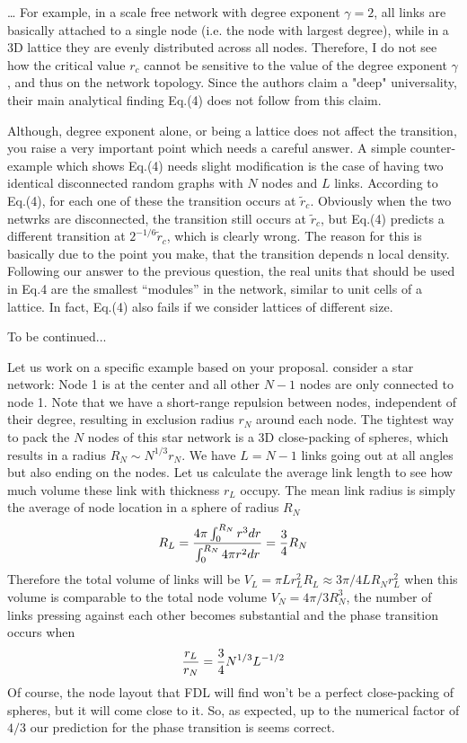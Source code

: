 \documentclass[11pt]{article}
\begin{document}
\begin{response}{
\dots 
For example, in a scale free network with degree exponent $\gamma=2$, all links are basically 
attached to a single node (i.e. the node with largest degree), while in a 3D lattice they are evenly distributed across all nodes. Therefore, I do not see how the critical value $r_c$ cannot be sensitive to the value of the degree exponent $\gamma$, and thus on the network topology. Since the authors claim a "deep" universality, their main analytical finding Eq.(4) does not follow from this claim.

}
Although, degree exponent alone, or being a lattice does not affect the transition, you raise a very important point which needs a careful answer.
A simple counter-example which shows Eq.(4) needs slight modification is the case of having two identical disconnected random graphs with $N$ nodes and $L$ links. 
According to Eq.(4), for each one of these the transition occurs at $\tilde{r}_c$. 
Obviously when the two netwrks are disconnected, the transition still occurs at $\tilde{r}_c$, but Eq.(4) predicts a different transition at $2^{-1/6}\tilde{r}_c$, which is clearly wrong. 
The reason for this is basically due to the point you make, that the transition depends n local density. 
Following our answer to the previous question,  the real units that should be used in Eq.4 are the smallest ``modules'' in the network, similar to unit cells of a lattice.
In fact, Eq.(4) also fails if we consider lattices of different size.

{\color{red} To be continued...}

Let us work on a specific example based on your proposal.
consider a star network: 
Node 1 is at the center and all other $N-1$ nodes are only connected to node 1. 
Note that we have a short-range repulsion between nodes, independent of their degree, resulting in exclusion radius $r_N$ around each node. 
The tightest way to pack the $N$ nodes of this star network is a 3D close-packing of spheres, which results in a radius $R_N\sim N^{1/3}r_N$.
We have $L=N-1$ links going out at all angles but also ending on the nodes.
Let us calculate the average link length to see how much volume these link with thickness $r_L$ occupy. 
The mean link radius is simply the average of node location in a sphere of radius $R_N$ 
\[R_L =  \frac{4\pi \int_0^{R_N} r^3dr }{\int_0^{R_N} 4\pi r^2 dr} = {3\over 4} R_N \]
Therefore the total volume of links will be $V_L = \pi L r_L^2 R_L \approx 3\pi/4 L R_N r_L^2 $ when this volume is comparable to the total node volume $V_N = 4\pi/3 R_N^3$, the number of links pressing against each other becomes substantial and the phase transition occurs when
%
\[ {r_L\over r_N} = {3\over 4} N^{1/3}L^{-1/2}\]
%
Of course, the node layout that FDL will find won't be a perfect close-packing of spheres, but it will come close to it.
So, as expected, up to the numerical factor of $4/3$ our prediction for the phase transition is seems correct.


\end{response}
\end{document}
